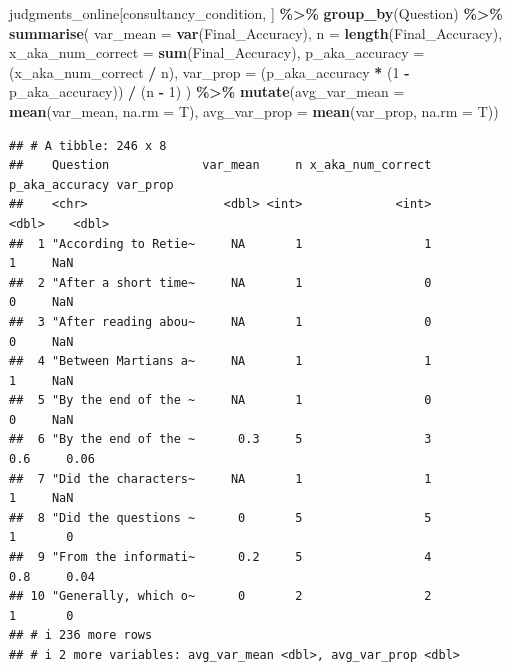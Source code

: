 \documentclass[
]{article}
\newenvironment{Shaded}{\begin{snugshade}}{\end{snugshade}}
\newcommand{\AttributeTok}[1]{\textcolor[rgb]{0.13,0.29,0.53}{#1}}
\newcommand{\DecValTok}[1]{\textcolor[rgb]{0.00,0.00,0.81}{#1}}
\newcommand{\FunctionTok}[1]{\textcolor[rgb]{0.13,0.29,0.53}{\textbf{#1}}}
\newcommand{\NormalTok}[1]{#1}
\newcommand{\SpecialCharTok}[1]{\textcolor[rgb]{0.81,0.36,0.00}{\textbf{#1}}}
\begin{document}
\begin{Shaded}
\begin{Highlighting}[]
\NormalTok{judgments\_online[consultancy\_condition, ] }\SpecialCharTok{\%\textgreater{}\%}
  \FunctionTok{group\_by}\NormalTok{(Question) }\SpecialCharTok{\%\textgreater{}\%}
  \FunctionTok{summarise}\NormalTok{(}
    \AttributeTok{var\_mean =} \FunctionTok{var}\NormalTok{(Final\_Accuracy),}
    \AttributeTok{n =} \FunctionTok{length}\NormalTok{(Final\_Accuracy),}
    \AttributeTok{x\_aka\_num\_correct =} \FunctionTok{sum}\NormalTok{(Final\_Accuracy),}
    \AttributeTok{p\_aka\_accuracy =}\NormalTok{ (x\_aka\_num\_correct }\SpecialCharTok{/}\NormalTok{ n),}
    \AttributeTok{var\_prop =}\NormalTok{ (p\_aka\_accuracy }\SpecialCharTok{*}\NormalTok{ (}\DecValTok{1} \SpecialCharTok{{-}}\NormalTok{ p\_aka\_accuracy)) }\SpecialCharTok{/}\NormalTok{ (n }\SpecialCharTok{{-}} \DecValTok{1}\NormalTok{)}
\NormalTok{  ) }\SpecialCharTok{\%\textgreater{}\%} \FunctionTok{mutate}\NormalTok{(}\AttributeTok{avg\_var\_mean =} \FunctionTok{mean}\NormalTok{(var\_mean, }\AttributeTok{na.rm =}\NormalTok{ T),}
               \AttributeTok{avg\_var\_prop =} \FunctionTok{mean}\NormalTok{(var\_prop, }\AttributeTok{na.rm =}\NormalTok{ T))}
\end{Highlighting}
\end{Shaded}

\begin{verbatim}
## # A tibble: 246 x 8
##    Question             var_mean     n x_aka_num_correct p_aka_accuracy var_prop
##    <chr>                   <dbl> <int>             <int>          <dbl>    <dbl>
##  1 "According to Retie~     NA       1                 1            1     NaN   
##  2 "After a short time~     NA       1                 0            0     NaN   
##  3 "After reading abou~     NA       1                 0            0     NaN   
##  4 "Between Martians a~     NA       1                 1            1     NaN   
##  5 "By the end of the ~     NA       1                 0            0     NaN   
##  6 "By the end of the ~      0.3     5                 3            0.6     0.06
##  7 "Did the characters~     NA       1                 1            1     NaN   
##  8 "Did the questions ~      0       5                 5            1       0   
##  9 "From the informati~      0.2     5                 4            0.8     0.04
## 10 "Generally, which o~      0       2                 2            1       0   
## # i 236 more rows
## # i 2 more variables: avg_var_mean <dbl>, avg_var_prop <dbl>
\end{verbatim}
\end{document}
